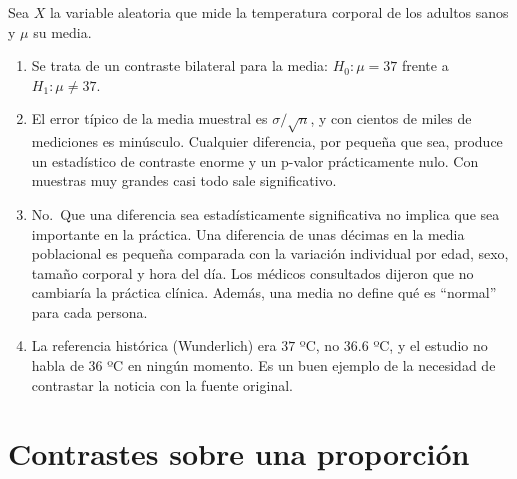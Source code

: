 \documentclass[
  spanish,
  a4paper,
]{scrreport}
\theoremstyle{definition}
\theoremstyle{remark}
\begin{document}
\begin{tcolorbox}[enhanced jigsaw, arc=.35mm, bottomrule=.15mm, bottomtitle=1mm, breakable, colback=white, colbacktitle=quarto-callout-tip-color!10!white, colframe=quarto-callout-tip-color-frame, coltitle=black, left=2mm, leftrule=.75mm, opacityback=0, opacitybacktitle=0.6, rightrule=.15mm, title=\textcolor{quarto-callout-tip-color}{\faLightbulb}\hspace{0.5em}{Solución}, titlerule=0mm, toprule=.15mm, toptitle=1mm]

Sea \(X\) la variable aleatoria que mide la temperatura corporal de los
adultos sanos y \(\mu\) su media.

\begin{enumerate}
\def\labelenumi{\alph{enumi}.}
\item
  Se trata de un contraste bilateral para la media: \(H_0: \mu=37\)
  frente a \(H_1: \mu\neq 37\).
\item
  El error típico de la media muestral es \(\sigma/\sqrt{n}\), y con
  cientos de miles de mediciones es minúsculo. Cualquier diferencia, por
  pequeña que sea, produce un estadístico de contraste enorme y un
  p-valor prácticamente nulo. Con muestras muy grandes casi todo sale
  significativo.
\item
  No.~Que una diferencia sea estadísticamente significativa no implica
  que sea importante en la práctica. Una diferencia de unas décimas en
  la media poblacional es pequeña comparada con la variación individual
  por edad, sexo, tamaño corporal y hora del día. Los médicos
  consultados dijeron que no cambiaría la práctica clínica. Además, una
  media no define qué es ``normal'' para cada persona.
\item
  La referencia histórica (Wunderlich) era \(37\) ºC, no \(36.6\) ºC, y
  el estudio no habla de \(36\) ºC en ningún momento. Es un buen ejemplo
  de la necesidad de contrastar la noticia con la fuente original.
\end{enumerate}

\end{tcolorbox}

\section{Contrastes sobre una
proporción}\label{contrastes-sobre-una-proporciuxf3n}
\end{document}
